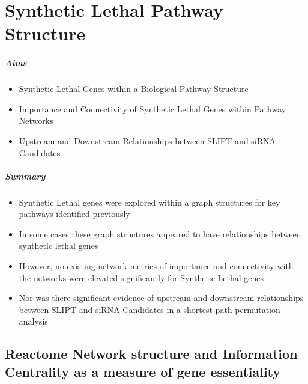 \chapter{Synthetic Lethal Pathway Structure}
\label{chap:Pathways}


\paragraph{Aims}

  \begin{itemize}
   \item Synthetic Lethal Genes within a Biological Pathway Structure
   
   \bigskip
   
   \item Importance and Connectivity of Synthetic Lethal Genes within Pathway Networks
   
   \bigskip
   
   \item Upstream and Downstream Relationships between SLIPT and siRNA Candidates
  \end{itemize}

\paragraph{Summary}

  \begin{itemize}
   \item Synthetic Lethal genes were explored within a graph structures for key pathways identified previously 
   
   \bigskip
   
   \item In some cases these graph structures appeared to have relationships between synthetic lethal genes  
   
   \bigskip
   
   \item However, no existing network metrics of importance and connectivity with the networks were elevated significantly for Synthetic Lethal genes
   
   \bigskip
   
   \item Nor was there significant evidence of upstream and downstream relationships between SLIPT and siRNA Candidates in a shortest path permutation analysis
  \end{itemize}

\section{Reactome Network structure and Information Centrality as a measure of gene essentiality}

